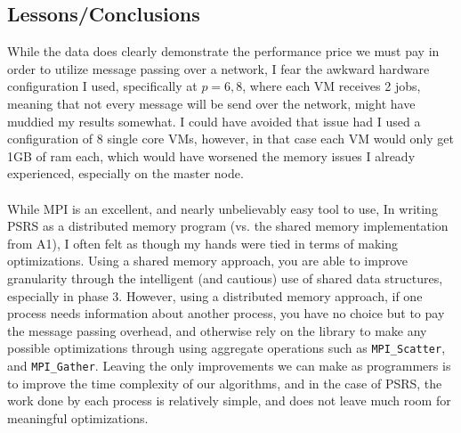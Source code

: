 \documentclass[11pt]{report}
\begin{document}
\subsection*{Lessons/Conclusions}
While the data does clearly demonstrate the performance price we must pay in order to utilize message
passing over a network, I fear the awkward hardware configuration I used, specifically at $p=6,8$, where each VM receives 2 jobs, meaning that not every message will be send over the network, might have muddied
my results somewhat. I could have avoided that issue had I used a configuration of 8 single core VMs, however, in that case each VM would only get 1GB of ram each, which would have worsened the memory issues
I already experienced, especially on the master node.\\\\
While MPI is an excellent, and nearly unbelievably easy tool to use, In writing PSRS as a distributed memory program (vs. the shared memory implementation from A1), I often felt as though my hands were tied in terms of making optimizations. Using a shared memory approach, you are able to improve granularity through the intelligent (and cautious) use of shared data structures, especially in phase 3. However, using a distributed memory approach, if one process needs information about another process, you have no choice but to pay the message passing overhead, and otherwise rely on the library to make any possible optimizations through using aggregate operations such as \verb|MPI_Scatter|, and \verb|MPI_Gather|. Leaving the only improvements we can make as programmers is to improve the time complexity of our algorithms, and in the case of PSRS, the work done by each process is relatively simple, and does not leave much room for meaningful optimizations.
\end{document}
